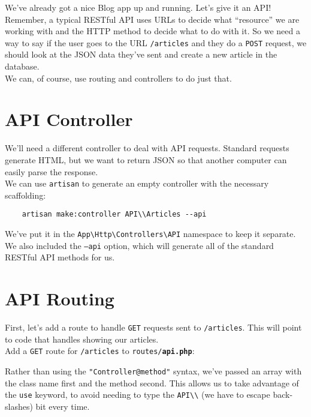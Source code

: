 We've already got a nice Blog app up and running. Let's give it an API!
\\

Remember, a typical RESTful API uses URLs to decide what ``resource'' we are working with and the HTTP method to decide what to do with it. So we need a way to say if the user goes to the URL \texttt{/articles} and they do a \texttt{POST} request, we should look at the JSON data they've sent and create a new article in the database.
\\

We can, of course, use routing and controllers to do just that.

\section{API Controller}

We'll need a different controller to deal with API requests. Standard requests generate HTML, but we want to return JSON so that another computer can easily parse the response.
\\

We can use \texttt{artisan} to generate an empty controller with the necessary scaffolding:

\begin{verbatim}
    artisan make:controller API\\Articles --api
\end{verbatim}

We've put it in the \texttt{App\textbackslash{}Http\textbackslash{}Controllers\textbackslash{}API} namespace to keep it separate. We also included the \texttt{--api} option, which will generate all of the standard RESTful API methods for us.


\section{API Routing}

First, let's add a route to handle \texttt{GET} requests sent to \texttt{/articles}. This will point to code that handles showing our articles.
\\

Add a \texttt{GET} route for \texttt{/articles} to \texttt{routes/\textbf{api.php}}:


Rather than using the \texttt{"Controller@method"} syntax, we've passed an array with the class name first and the method second. This allows us to take advantage of the \texttt{use} keyword, to avoid needing to type the \texttt{API\textbackslash\textbackslash} (we have to escape back-slashes) bit every time.
\\

